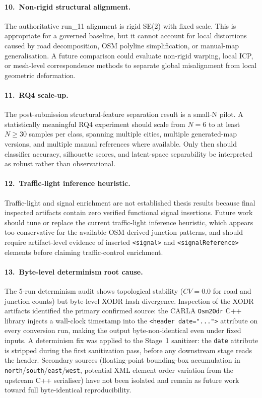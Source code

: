 \paragraph{10.\ Non-rigid structural alignment.}
The authoritative run\_11 alignment is rigid SE(2) with fixed scale. This is appropriate for a governed baseline, but it cannot account for local distortions caused by road decomposition, OSM polyline simplification, or manual-map generalisation. A future comparison could evaluate non-rigid warping, local ICP, or mesh-level correspondence methods to separate global misalignment from local geometric deformation.

\paragraph{11.\ RQ4 scale-up.}
The post-submission structural-feature separation result is a small-N pilot. A statistically meaningful RQ4 experiment should scale from $N=6$ to at least $N\geq30$ samples per class, spanning multiple cities, multiple generated-map versions, and multiple manual references where available. Only then should classifier accuracy, silhouette scores, and latent-space separability be interpreted as robust rather than observational.

\paragraph{12.\ Traffic-light inference heuristic.}
Traffic-light and signal enrichment are not established thesis results because final inspected artifacts contain zero verified functional signal insertions. Future work should tune or replace the current traffic-light inference heuristic, which appears too conservative for the available OSM-derived junction patterns, and should require artifact-level evidence of inserted \texttt{<signal>} and \texttt{<signalReference>} elements before claiming traffic-control enrichment.

\paragraph{13.\ Byte-level determinism root cause.}
The 5-run determinism audit shows topological stability ($CV=0.0$ for road and junction counts) but byte-level XODR hash divergence. Inspection of the XODR artifacts identified the primary confirmed source: the CARLA \texttt{Osm2Odr} C++ library injects a wall-clock timestamp into the \texttt{<header date="...">} attribute on every conversion run, making the output byte-non-identical even under fixed inputs. A determinism fix was applied to the Stage~1 sanitizer: the \texttt{date} attribute is stripped during the first sanitization pass, before any downstream stage reads the header. Secondary sources (floating-point bounding-box accumulation in \texttt{north}/\texttt{south}/\texttt{east}/\texttt{west}, potential XML element order variation from the upstream C++ serialiser) have not been isolated and remain as future work toward full byte-identical reproducibility.

